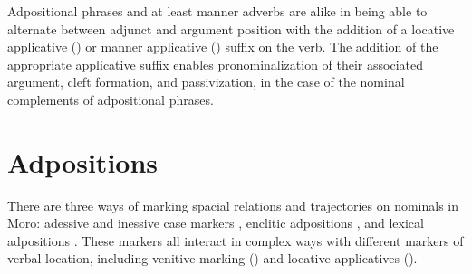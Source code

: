 Adpositional phrases and at least manner adverbs are alike in being able to alternate between adjunct and argument position with the addition of a locative applicative () or manner applicative () suffix on the verb. The addition of the appropriate applicative suffix enables pronominalization of their associated argument, cleft formation, and passivization, in the case of the nominal complements of adpositional phrases. 

%
%





%

\section{Adpositions}\label{sec:ch13:adpositions}

There are three ways of marking spacial relations and trajectories on nominals in Moro: adessive and inessive case markers , enclitic adpositions , and lexical adpositions . These markers all interact in complex ways with different markers of verbal location, including venitive marking () and locative applicatives ().


